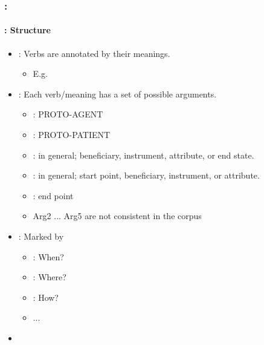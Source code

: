 \documentclass[xcolor=table]{beamer}
\begin{document}
\begin{frame}
	\frametitle{\insertshortsubtitle: \insertsection}
	\framesubtitle{\insertsubsection: Structure}
	
	\begin{itemize}
		\item {}: Verbs are annotated by their meanings.
		\begin{itemize}
			\item E.g. 		
		\end{itemize}
		
		\item {}: Each verb/meaning has a set of possible arguments.  
		\begin{itemize}
			\item {}: PROTO-AGENT
			\item {}: PROTO-PATIENT
			\item {}: in general; beneficiary, instrument, attribute, or end state.
			\item {}: in general; start point, beneficiary, instrument, or attribute.
			\item {}: end point
			\item Arg2 ... Arg5 are not consistent in the corpus
		\end{itemize}
	
		\item {}: Marked by   
		\begin{itemize}
			\item {}: When?
			\item {}: Where?
			\item {}: How? 
			\item ...
		\end{itemize}
		
		\item {} 
	\end{itemize}
	
\end{frame}
\end{document}
